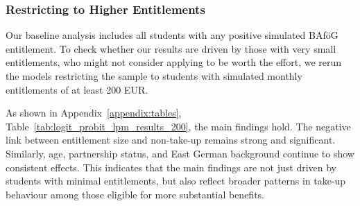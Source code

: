 \subsubsection{Restricting to Higher Entitlements}
Our baseline analysis includes all students with any positive simulated BAföG entitlement. 
To check whether our results are driven by those with very small entitlements, who might not consider applying to be worth the effort, we rerun the models restricting the sample to students with simulated monthly entitlements of at least 200 EUR.

As shown in Appendix~\ref{appendix:tables}, Table~\ref{tab:logit_probit_lpm_results_200}, the main findings hold. The negative link between entitlement size and non-take-up remains strong and significant. Similarly, age, partnership status, and East German background continue to show consistent effects. This indicates that the main findings are not just driven by students with minimal entitlements, but also reflect broader patterns in take-up behaviour among those eligible for more substantial benefits.

